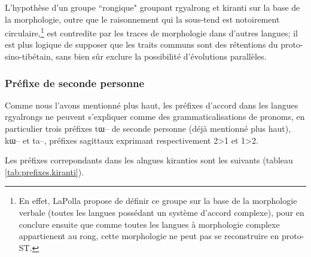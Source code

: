 \documentclass[oldfontcommands,oneside,a4paper,11pt]{memoir}
\begin{document}
L'hypothèse d'un groupe ``rongique" groupant rgyalrong et kiranti sur la base de la morphologie, outre que le raisonnement qui la sous-tend est notoirement circulaire,\footnote{En effet, LaPolla propose de définir ce groupe sur la base de la morphologie verbale (toutes les langues possédant un système d'accord complexe), pour en conclure ensuite que comme toutes les langues à morphologie complexe appartienent au rong, cette morphologie ne peut pas se reconstruire en proto-ST. } est contredite par les traces de morphologie dans d'autres langues; il est plus logique de supposer que les traits communs sont des rétentions du proto-sino-tibétain, sans bien sûr exclure la possibilité d'évolutions parallèles.







\subsubsection{Préfixe de seconde personne}
Comme nous l'avons mentionné plus haut, les préfixes d'accord dans les langues rgyalrongs ne peuvent s'expliquer comme des grammaticalisations de pronoms, en particulier  trois préfixes  tɯ-- de seconde personne (déjà mentionné plus haut), kɯ-- et ta--, préfixes sagittaux exprimant respectivement 2>1 et 1>2. 

Les préfixes correpondants dans les alngues kiranties sont les suivants (tableau \ref{tab:prefixes.kiranti}).
\end{document}
